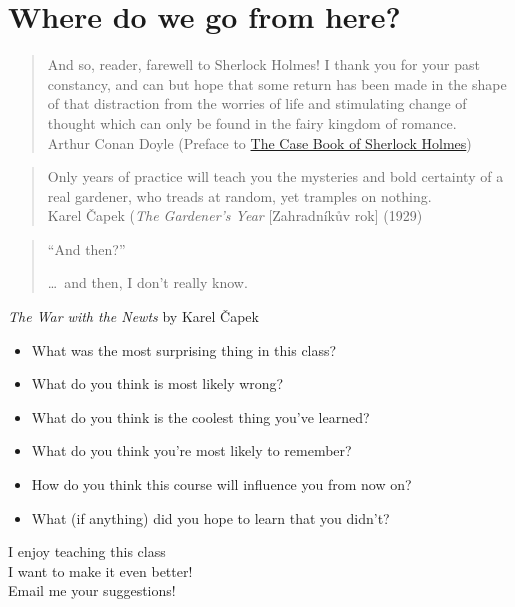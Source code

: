 \documentclass[a4paper,landscape,headrule,footrule,xetex]{foils}
\begin{document}
\maketitle

%
\section{Where do we go from here?}
\begin{quotation}
And so, reader, farewell to Sherlock Holmes! I thank you for your past constancy, and can but hope that some return has been made in the shape of that distraction from the worries of life and stimulating change of thought which can only be found in the fairy kingdom of romance.
\\ \mbox{} \hfill Arthur Conan Doyle (Preface to \href{http://compling.hss.ntu.edu.sg/canon/case.html}{The Case Book of Sherlock Holmes})
\end{quotation}
\begin{quotation}
Only years of practice will teach you the mysteries and bold certainty of a real gardener, who treads at random, yet tramples on nothing.
\\ \mbox{} \hfill Karel Čapek (\textit{The Gardener's Year} [Zahradníkův rok] (1929) 
\end{quotation}


\begin{quotation}
  “And then?”
  \bigskip
  \bigskip
  
  \ldots\   and then, I don't really know.
\end{quotation}

\textit{The War with the Newts} by Karel Čapek

\begin{itemize}
\item What was the most surprising thing in this class?
\item What do you think is most likely wrong?
\item What do you think is the coolest thing you've learned?
\item What do you think you're most likely to
remember?
\item How do you think this course will influence you from now on?
\item What (if anything) did you hope to learn that you didn't?
\end{itemize}
\bigskip\bigskip
\begin{center}
  I enjoy teaching this class \\
  I  want to make it even better! \\
  Email me your suggestions!
\end{center}
\end{document}
